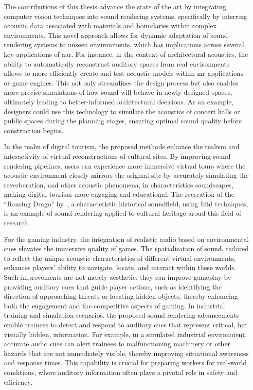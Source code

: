 The contributions of this thesis advance the state of the art by integrating computer vision techniques into sound rendering systems, specifically by inferring acoustic data associated with materials and boundaries within complex environments. This novel approach allows for dynamic adaptation of sound rendering systems to unseen environments, which has implications across several key applications of \acrfull{aar}.
For instance, in the context of architectural acoustics, the ability to automatically reconstruct auditory spaces from real environments allows to more efficiently create and test acoustic models within \acrshort{mr} applications or game engines. This not only streamlines the design process but also enables more precise simulations of how sound will behave in newly designed spaces, ultimately leading to better-informed architectural decisions. As an example, designers could use this technology to simulate the acoustics of concert halls or public spaces during the planning stages, ensuring optimal sound quality before construction begins.\par
In the realm of digital tourism, the proposed methods enhance the realism and interactivity of virtual reconstructions of cultural sites. By improving sound rendering pipelines, users can experience more immersive virtual tours where the acoustic environment closely mirrors the original site by accurately simulating the reverberation, and other acoustic phenomena, in characteristics soundscapes, making digital tourism more engaging and educational. The recreation of the ``Roaring Drago'' by~\cite{yokota2008numerical}, a characteristic historical soundfield, using \acrshort{fdtd} techniques, is an example of sound rendering applied to cultural heritage aroud this field of research.\par
For the gaming industry, the integration of realistic audio based on environmental cues elevates the immersive quality of games. The spatialisation of sound, tailored to reflect the unique acoustic characteristics of different virtual environments, enhances players' ability to navigate, locate, and interact within these worlds. Such improvements are not merely aesthetic; they can improve gameplay by providing auditory cues that guide player actions, such as identifying the direction of approaching threats or locating hidden objects, thereby enhancing both the engagement and the competitive aspects of gaming.
In industrial training and simulation scenarios, the proposed sound rendering advancements enable trainees to detect and respond to auditory cues that represent critical, but visually hidden, information. For example, in a simulated industrial environment, accurate audio cues can alert trainees to malfunctioning machinery or other hazards that are not immediately visible, thereby improving situational awareness and response times. This capability is crucial for preparing workers for real-world conditions, where auditory information often plays a pivotal role in safety and efficiency.
